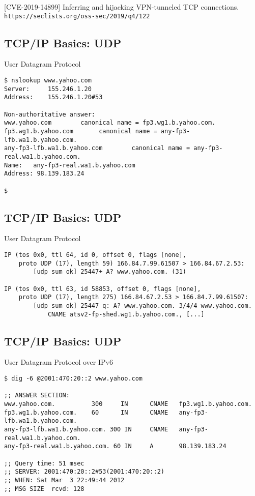 \documentclass[xga]{xdvislides}
\begin{document}
[CVE-2019-14899] Inferring and hijacking VPN-tunneled TCP connections. \\
\verb+https://seclists.org/oss-sec/2019/q4/122+

\subsection{TCP/IP Basics: UDP}
\begin{center}
User Datagram Protocol
\end{center}
\vspace{.2in}
\begin{verbatim}
$ nslookup www.yahoo.com
Server:		155.246.1.20
Address:	155.246.1.20#53

Non-authoritative answer:
www.yahoo.com        canonical name = fp3.wg1.b.yahoo.com.
fp3.wg1.b.yahoo.com       canonical name = any-fp3-lfb.wa1.b.yahoo.com.
any-fp3-lfb.wa1.b.yahoo.com        canonical name = any-fp3-real.wa1.b.yahoo.com.
Name:	any-fp3-real.wa1.b.yahoo.com
Address: 98.139.183.24

$
\end{verbatim}

\subsection{TCP/IP Basics: UDP}
\begin{center}
User Datagram Protocol
\end{center}
\vspace{.2in}
\begin{verbatim}
IP (tos 0x0, ttl 64, id 0, offset 0, flags [none],
    proto UDP (17), length 59) 166.84.7.99.61507 > 166.84.67.2.53:
        [udp sum ok] 25447+ A? www.yahoo.com. (31)

IP (tos 0x0, ttl 63, id 58853, offset 0, flags [none],
    proto UDP (17), length 275) 166.84.67.2.53 > 166.84.7.99.61507:
        [udp sum ok] 25447 q: A? www.yahoo.com. 3/4/4 www.yahoo.com.
            CNAME atsv2-fp-shed.wg1.b.yahoo.com., [...]
\end{verbatim}

\subsection{TCP/IP Basics: UDP}
\begin{center}
User Datagram Protocol over IPv6
\end{center}
\vspace{.2in}
\begin{verbatim}
$ dig -6 @2001:470:20::2 www.yahoo.com

;; ANSWER SECTION:
www.yahoo.com.          300     IN      CNAME   fp3.wg1.b.yahoo.com.
fp3.wg1.b.yahoo.com.    60      IN      CNAME   any-fp3-lfb.wa1.b.yahoo.com.
any-fp3-lfb.wa1.b.yahoo.com. 300 IN     CNAME   any-fp3-real.wa1.b.yahoo.com.
any-fp3-real.wa1.b.yahoo.com. 60 IN     A       98.139.183.24

;; Query time: 51 msec
;; SERVER: 2001:470:20::2#53(2001:470:20::2)
;; WHEN: Sat Mar  3 22:49:44 2012
;; MSG SIZE  rcvd: 128

\end{verbatim}
\end{document}
